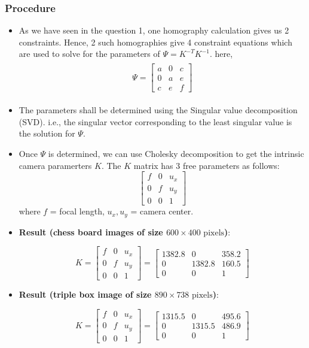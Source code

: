\documentclass[fleqn]{article}
\begin{document}
\subsubsection{Procedure}
\begin{itemize}
\item As we have seen in the question 1, one homography calculation gives us 2 constraints. Hence, 2 such homographies give 
4 constraint equations which are used to solve for the parameters of $\Psi = K^{-T}K^{-1}$.
  here, 
  \begin{eqnarray*}
  \begin{aligned}
  \Psi = \begin{bmatrix}
   		a & 0 & c \\
   		0 & a & e \\
   		c & e & f
   \end{bmatrix}
  \end{aligned}
  \end{eqnarray*}
  \item The parameters shall be determined using the Singular value decomposition (SVD). i.e., the singular vector corresponding to the least singular
  value is the solution for $\Psi$.
  \item Once $\Psi$ is determined, we can use Cholesky decomposition to get the intrinsic camera paramerters $K$. 
  The $K$ matrix has 3 free parameters as follows:
  \[
   \begin{bmatrix}
   		f & 0 & u_x \\
   		0 & f & u_y \\
   		0 & 0 & 1
   \end{bmatrix}
  \]
  where  $f$ = focal length, $u_x, u_y$ = camera center.

\item \textbf{Result (chess board images of size $600 \times 400 \text{ pixels}$)}:

\[
 K = \begin{bmatrix}
   		f & 0 & u_x \\
   		0 & f & u_y \\
   		0 & 0 & 1
   \end{bmatrix}
=    \begin{bmatrix}
   		1382.8 & 0 & 358.2 \\
   		0 & 1382.8 & 160.5 \\
   		0 & 0 & 1
   \end{bmatrix}
\]

\item \textbf{Result (triple box image of size $890 \times 738 \text{ pixels}$)}:

\[
 K = \begin{bmatrix}
   		f & 0 & u_x \\
   		0 & f & u_y \\
   		0 & 0 & 1
   \end{bmatrix}
=    \begin{bmatrix}
   		1315.5 & 0 & 495.6 \\
   		0 & 1315.5 & 486.9 \\
   		0 & 0 & 1
   \end{bmatrix}
\]
\end{itemize}
\end{document}
